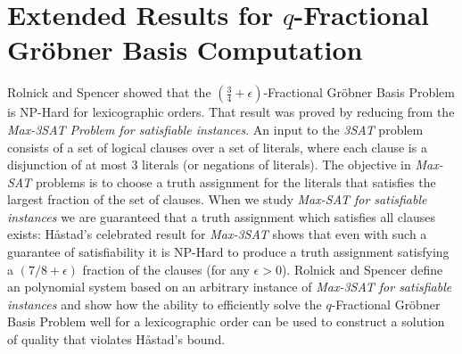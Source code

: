 \documentclass{article}
\begin{document}
\section{Extended Results for $q$-Fractional Gr\"{o}bner Basis Computation}
Rolnick and Spencer showed that the  $(\frac{3}{4}+\epsilon)$-Fractional Gr\"{o}bner Basis Problem is NP-Hard for lexicographic orders. 
That result was proved by reducing from the \textit{Max-3SAT Problem for satisfiable instances}. An input to the \textit{3SAT} problem consists of a set of logical clauses over a set of literals, where each clause is a disjunction of at most 3 literals (or negations of literals). 
The objective in \textit{Max-SAT} problems is to choose a truth assignment for the literals that satisfies the largest fraction of the set of clauses. When we study \textit{Max-SAT for satisfiable instances} we are guaranteed that a truth assignment which satisfies all clauses exists: H{\aa}stad's celebrated result for \textit{Max-3SAT} shows that even with such a guarantee of satisfiability it is NP-Hard to produce a truth assignment satisfying a $(7/8+\epsilon)$ fraction of the clauses (for any $\epsilon>0$).  Rolnick and Spencer define an polynomial system based on an arbitrary instance of \textit{Max-3SAT for satisfiable instances} and show how the ability to efficiently solve the $q$-Fractional Gr\"{o}bner Basis Problem well for a lexicographic order can be used to construct a solution of quality that violates H{\aa}stad's bound. 
\end{document}
